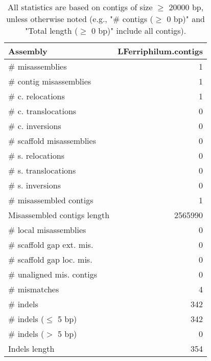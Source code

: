 \documentclass[12pt,a4paper]{article}
\begin{document}
\begin{table}[ht]
\begin{center}
\caption{All statistics are based on contigs of size $\geq$ 20000 bp, unless otherwise noted (e.g., "\# contigs ($\geq$ 0 bp)" and "Total length ($\geq$ 0 bp)" include all contigs).}
\begin{tabular}{|l*{1}{|r}|}
\hline
Assembly & LFerriphilum.contigs \\ \hline
\# misassemblies & 1 \\ \hline
\hspace{2mm}\# contig misassemblies & 1 \\ \hline
\hspace{5mm}\# c. relocations & 1 \\ \hline
\hspace{5mm}\# c. translocations & 0 \\ \hline
\hspace{5mm}\# c. inversions & 0 \\ \hline
\hspace{2mm}\# scaffold misassemblies & 0 \\ \hline
\hspace{5mm}\# s. relocations & 0 \\ \hline
\hspace{5mm}\# s. translocations & 0 \\ \hline
\hspace{5mm}\# s. inversions & 0 \\ \hline
\# misassembled contigs & 1 \\ \hline
Misassembled contigs length & 2565990 \\ \hline
\# local misassemblies & 0 \\ \hline
\# scaffold gap ext. mis. & 0 \\ \hline
\# scaffold gap loc. mis. & 0 \\ \hline
\# unaligned mis. contigs & 0 \\ \hline
\# mismatches & 4 \\ \hline
\# indels & 342 \\ \hline
\hspace{5mm}\# indels ($\leq$ 5 bp) & 342 \\ \hline
\hspace{5mm}\# indels ($>$ 5 bp) & 0 \\ \hline
Indels length & 354 \\ \hline
\end{tabular}
\end{center}
\end{table}
\end{document}
